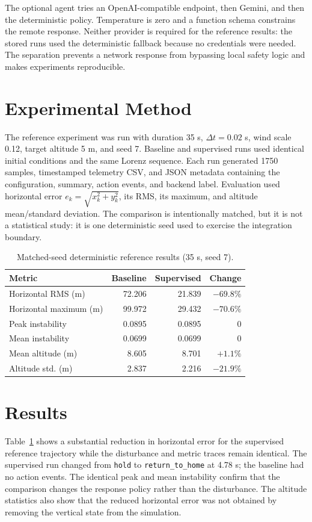 \documentclass[10pt,conference]{IEEEtran}
\begin{document}
The optional agent tries an OpenAI-compatible endpoint, then Gemini, and then
the deterministic policy. Temperature is zero and a function schema constrains
the remote response. Neither provider is required for the reference results:
the stored runs used the deterministic fallback because no credentials were
needed. The separation prevents a network response from bypassing local safety
logic and makes experiments reproducible.

\section{Experimental Method}
The reference experiment was run with duration 35 s, $\Delta t=0.02$ s, wind
scale 0.12, target altitude 5 m, and seed 7. Baseline and supervised runs used
identical initial conditions and the same Lorenz sequence. Each run generated
1750 samples, timestamped telemetry CSV, and JSON metadata containing the
configuration, summary, action events, and backend label. Evaluation used
horizontal error $e_k=\sqrt{x_k^2+y_k^2}$, its RMS, its maximum, and altitude
mean/standard deviation. The comparison is intentionally matched, but it is
not a statistical study: it is one deterministic seed used to exercise the
integration boundary.

\begin{table}[t]
\centering
\caption{Matched-seed deterministic reference results (35 s, seed 7).}
\label{tab:results}
\footnotesize
\begin{tabular}{lrrr}
\toprule
Metric & Baseline & Supervised & Change\\
\midrule
Horizontal RMS (m) & 72.206 & 21.839 & $-69.8\%$\\
Horizontal maximum (m) & 99.972 & 29.432 & $-70.6\%$\\
Peak instability & 0.0895 & 0.0895 & 0\\
Mean instability & 0.0699 & 0.0699 & 0\\
Mean altitude (m) & 8.605 & 8.701 & $+1.1\%$\\
Altitude std. (m) & 2.837 & 2.216 & $-21.9\%$\\
\bottomrule
\end{tabular}
\end{table}

\section{Results}
Table~\ref{tab:results} shows a substantial reduction in horizontal error for
the supervised reference trajectory while the disturbance and metric traces
remain identical. The supervised run changed from \texttt{hold} to
\texttt{return\_to\_home} at 4.78 s; the baseline had no action events. The
identical peak and mean instability confirm that the comparison changes the
response policy rather than the disturbance. The altitude statistics also show
that the reduced horizontal error was not obtained by removing the vertical
state from the simulation.
\end{document}
